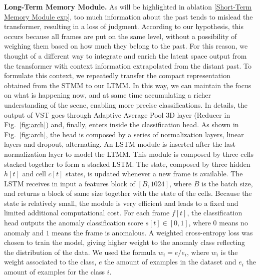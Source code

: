 \noindent\textbf{Long-Term Memory Module.}
\label{Long-Term Memory Module descr}
As will be highlighted in ablation \ref{Short-Term Memory Module exp}, too much information about the past tends to mislead the transformer, resulting in a loss of judgment.
According to our hypothesis, this occurs because all frames are put on the same level, without a possibility of weighing them based on how much they belong to the past.
For this reason, we thought of a different way to integrate and enrich the latent space output from the transformer with context information extrapolated from the distant past.
To formulate this context, we repeatedly transfer the compact representation obtained from the STMM to our LTMM.
In this way, we can maintain the focus on what is happening now, and at same time accumulating a richer understanding of the scene, enabling more precise classifications.
In details, the output of VST goes through Adaptive Average Pool 3D layer (Reducer in Fig.~\ref{fig:arch}) and, finally, enters inside the classification head.
As shown in Fig.~\ref{fig:arch}, the head is composed by a series of normalization layers, linear layers and dropout, alternating. 
An LSTM module is inserted after the last normalization layer to model the LTMM.
This module is composed by three cells stacked together to form a stacked LSTM.
The state, composed by three hidden $h[t]$ and cell $c[t]$ states, is updated whenever a new frame is available.
The LSTM receives in input a features block of $[B, 1024]$, where $B$ is the batch size, and returns a block of same size together with the state of the cells.
Because the state is relatively small, the module is very efficient and leads to a fixed and limited additional computational cost.
For each frame $f[t]$, the classification head outputs the anomaly classification score $s[t] \in [0,1]$, where $0$ means no anomaly and $1$ means the frame is anomalous.
A weighted cross-entropy loss was chosen to train the model, giving higher weight to the anomaly class reflecting the distribution of the data.
We used the formula $w_i = e / e_i$, where $w_i$ is the weight associated to the class, $e$ the amount of examples in the dataset and $e_i$ the amount of examples for the class $i$.

